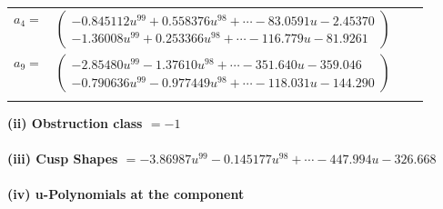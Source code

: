 \documentclass[1p]{elsarticle_modified}
\theoremstyle{definition}
\begin{document}
\begin{tabular}{m{7pt} m{180pt} m{7pt} m{180pt} }
\flushright $a_{4}=$&$\begin{pmatrix}-0.845112 u^{99}+0.558376 u^{98}+\cdots-83.0591 u-2.45370\\-1.36008 u^{99}+0.253366 u^{98}+\cdots-116.779 u-81.9261\end{pmatrix}$ \\
\flushright $a_{9}=$&$\begin{pmatrix}-2.85480 u^{99}-1.37610 u^{98}+\cdots-351.640 u-359.046\\-0.790636 u^{99}-0.977449 u^{98}+\cdots-118.031 u-144.290\end{pmatrix}$\\&\end{tabular}
\flushleft \textbf{(ii) Obstruction class $= -1$}\\~\\
\flushleft \textbf{(iii) Cusp Shapes $= -3.86987 u^{99}-0.145177 u^{98}+\cdots-447.994 u-326.668$}\\~\\
\newpage\renewcommand{\arraystretch}{1}
\flushleft \textbf{(iv) u-Polynomials at the component}\newline \\
\end{document}
